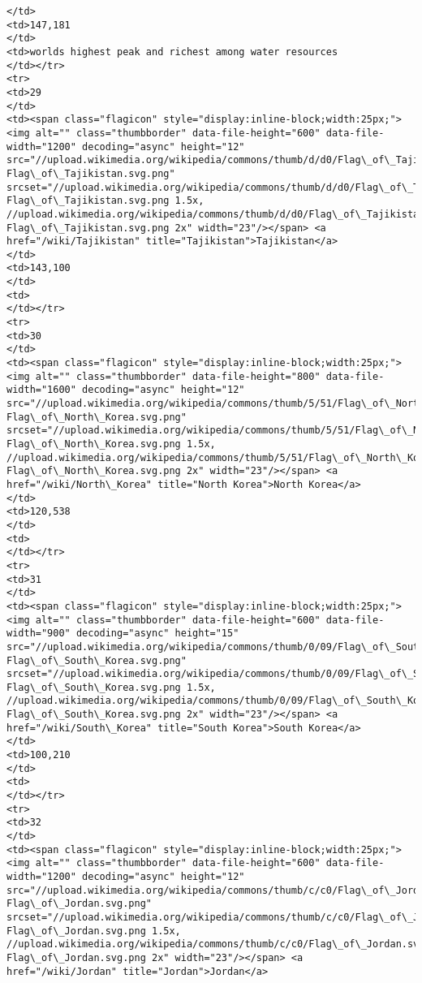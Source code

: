 \documentclass[11pt]{article}
\begin{document}
\begin{Verbatim}[commandchars=\\\{\}]
</td>
<td>147,181
</td>
<td>worlds highest peak and richest among water resources
</td></tr>
<tr>
<td>29
</td>
<td><span class="flagicon" style="display:inline-block;width:25px;"><img alt="" class="thumbborder" data-file-height="600" data-file-width="1200" decoding="async" height="12" src="//upload.wikimedia.org/wikipedia/commons/thumb/d/d0/Flag\_of\_Tajikistan.svg/23px-Flag\_of\_Tajikistan.svg.png" srcset="//upload.wikimedia.org/wikipedia/commons/thumb/d/d0/Flag\_of\_Tajikistan.svg/35px-Flag\_of\_Tajikistan.svg.png 1.5x, //upload.wikimedia.org/wikipedia/commons/thumb/d/d0/Flag\_of\_Tajikistan.svg/46px-Flag\_of\_Tajikistan.svg.png 2x" width="23"/></span> <a href="/wiki/Tajikistan" title="Tajikistan">Tajikistan</a>
</td>
<td>143,100
</td>
<td>
</td></tr>
<tr>
<td>30
</td>
<td><span class="flagicon" style="display:inline-block;width:25px;"><img alt="" class="thumbborder" data-file-height="800" data-file-width="1600" decoding="async" height="12" src="//upload.wikimedia.org/wikipedia/commons/thumb/5/51/Flag\_of\_North\_Korea.svg/23px-Flag\_of\_North\_Korea.svg.png" srcset="//upload.wikimedia.org/wikipedia/commons/thumb/5/51/Flag\_of\_North\_Korea.svg/35px-Flag\_of\_North\_Korea.svg.png 1.5x, //upload.wikimedia.org/wikipedia/commons/thumb/5/51/Flag\_of\_North\_Korea.svg/46px-Flag\_of\_North\_Korea.svg.png 2x" width="23"/></span> <a href="/wiki/North\_Korea" title="North Korea">North Korea</a>
</td>
<td>120,538
</td>
<td>
</td></tr>
<tr>
<td>31
</td>
<td><span class="flagicon" style="display:inline-block;width:25px;"><img alt="" class="thumbborder" data-file-height="600" data-file-width="900" decoding="async" height="15" src="//upload.wikimedia.org/wikipedia/commons/thumb/0/09/Flag\_of\_South\_Korea.svg/23px-Flag\_of\_South\_Korea.svg.png" srcset="//upload.wikimedia.org/wikipedia/commons/thumb/0/09/Flag\_of\_South\_Korea.svg/35px-Flag\_of\_South\_Korea.svg.png 1.5x, //upload.wikimedia.org/wikipedia/commons/thumb/0/09/Flag\_of\_South\_Korea.svg/45px-Flag\_of\_South\_Korea.svg.png 2x" width="23"/></span> <a href="/wiki/South\_Korea" title="South Korea">South Korea</a>
</td>
<td>100,210
</td>
<td>
</td></tr>
<tr>
<td>32
</td>
<td><span class="flagicon" style="display:inline-block;width:25px;"><img alt="" class="thumbborder" data-file-height="600" data-file-width="1200" decoding="async" height="12" src="//upload.wikimedia.org/wikipedia/commons/thumb/c/c0/Flag\_of\_Jordan.svg/23px-Flag\_of\_Jordan.svg.png" srcset="//upload.wikimedia.org/wikipedia/commons/thumb/c/c0/Flag\_of\_Jordan.svg/35px-Flag\_of\_Jordan.svg.png 1.5x, //upload.wikimedia.org/wikipedia/commons/thumb/c/c0/Flag\_of\_Jordan.svg/46px-Flag\_of\_Jordan.svg.png 2x" width="23"/></span> <a href="/wiki/Jordan" title="Jordan">Jordan</a>

\end{Verbatim}
\end{document}
